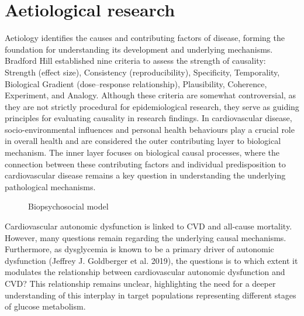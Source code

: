 \documentclass[
  a4paper,
  headsepline=true,
  open=any]{scrbook}
\begin{document}

\hypertarget{aetiological-research}{%
\chapter{Aetiological research}\label{aetiological-research}}

Aetiology identifies the causes and contributing factors of disease,
forming the foundation for understanding its development and underlying
mechanisms. Bradford Hill established nine criteria to assess the
strength of causality: Strength (effect size), Consistency
(reproducibility), Specificity, Temporality, Biological Gradient
(dose--response relationship), Plausibility, Coherence, Experiment, and
Analogy. Although these criteria are somewhat controversial, as they are
not strictly procedural for epidemiological research, they serve as
guiding principles for evaluating causality in research findings. In
cardiovascular disease, socio-environmental influences and personal
health behaviours play a crucial role in overall health and are
considered the outer contributing layer to biological mechanism. The
inner layer focuses on biological causal processes, where the connection
between these contributing factors and individual predisposition to
cardiovascular disease remains a key question in understanding the
underlying pathological mechanisms.

\begin{figure}

\begin{minipage}[t]{\linewidth}

{\centering 


\caption{Biopsychosocial model}

}

\end{minipage}%

\end{figure}

Cardiovascular autonomic dysfunction is linked to CVD and all-cause
mortality. However, many questions remain regarding the underlying
causal mechanisms. Furthermore, as dysglycemia is known to be a primary
driver of autonomic dysfunction (Jeffrey J. Goldberger et al. 2019), the
questions is to which extent it modulates the relationship between
cardiovascular autonomic dysfunction and CVD? This relationship remains
unclear, highlighting the need for a deeper understanding of this
interplay in target populations representing different stages of glucose
metabolism.
\end{document}
